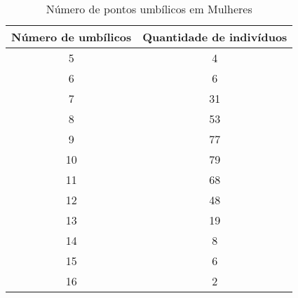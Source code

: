 \documentclass[a4paper,12pt]{article}
\begin{document}
\begin{table}[h!]
\centering
\caption{Número de pontos umbílicos em Mulheres}
\begin{tabular}{c c}
\hline
\textbf{Número de umbílicos} & \textbf{Quantidade de indivíduos} \\ 
\hline
5  & 4   \\
6  & 6   \\
7  & 31  \\
8  & 53  \\
9  & 77  \\
10 & 79  \\
11 & 68  \\
12 & 48  \\
13 & 19  \\
14 & 8   \\
15 & 6   \\
16 & 2   \\
\hline
\end{tabular}
\end{table}
\end{document}
